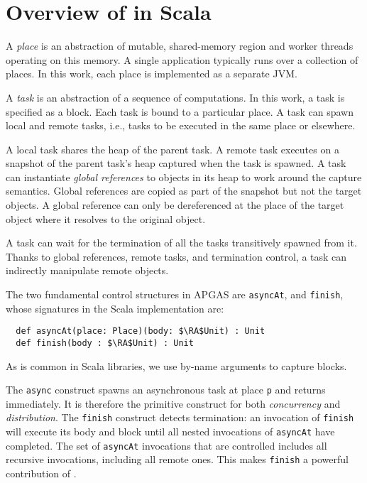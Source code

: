 

\section{Overview of \apgas in Scala}
\label{sec:apgas}

A {\em place} is an abstraction of mutable, shared-memory region and worker threads operating on this memory.
A single application typically runs over a collection of places. In this work, each place is implemented as a separate JVM.

A {\em task} is an abstraction of a sequence of computations. In this work, a task is specified as a block.
Each task is bound to a particular place. 
A task can spawn local and remote tasks, i.e., tasks to be executed in the same place or elsewhere.

A local task shares the heap of the parent task. A remote task executes on a snapshot of the parent task's heap captured when the task is spawned. A task can instantiate \emph{global references} to objects in its heap to work around the capture semantics.
Global references are copied as part of the snapshot but not the target objects. A global reference can only be dereferenced
at the place of the target object where it resolves to the original object.

A task can wait for the termination of all the tasks transitively spawned from it.
Thanks to global references, remote tasks, and termination control,
a task can indirectly manipulate remote objects.

The two fundamental control structures in APGAS are
 \lstinline{asyncAt}, and \lstinline{finish}, whose signatures in
the Scala implementation are:
\begin{lstlisting}
  def asyncAt(place: Place)(body: $\RA$Unit) : Unit
  def finish(body : $\RA$Unit) : Unit
\end{lstlisting}
As is common in Scala libraries, we use by-name arguments to capture blocks.

The \lstinline{async} construct spawns an asynchronous task at place \lstinline{p} and returns
immediately. It is therefore the primitive construct for both \emph{concurrency} and \emph{distribution}.
The \lstinline{finish} construct detects termination: an invocation of
\lstinline{finish} will execute its body and block until all nested invocations
of \lstinline{asyncAt} have completed. The set of \lstinline{asyncAt} invocations
that are controlled includes all recursive invocations, including all remote
ones. This makes \lstinline{finish} a powerful contribution of \apgas.

